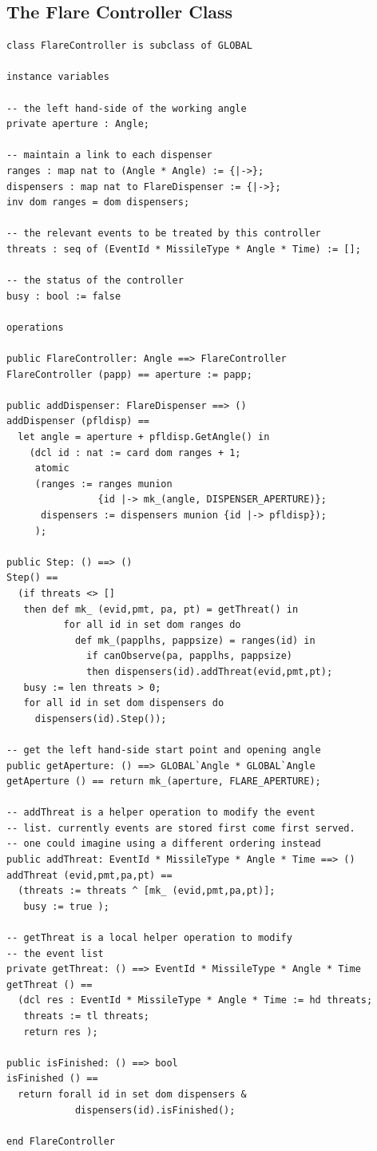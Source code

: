 \documentclass{overturerepchap}
\begin{document}
\subsection{The Flare Controller Class}

\begin{lstlisting}
class FlareController is subclass of GLOBAL

instance variables

-- the left hand-side of the working angle
private aperture : Angle;

-- maintain a link to each dispenser
ranges : map nat to (Angle * Angle) := {|->};
dispensers : map nat to FlareDispenser := {|->};
inv dom ranges = dom dispensers;

-- the relevant events to be treated by this controller
threats : seq of (EventId * MissileType * Angle * Time) := [];

-- the status of the controller
busy : bool := false

operations

public FlareController: Angle ==> FlareController
FlareController (papp) == aperture := papp;

public addDispenser: FlareDispenser ==> ()
addDispenser (pfldisp) ==
  let angle = aperture + pfldisp.GetAngle() in
    (dcl id : nat := card dom ranges + 1;
     atomic
     (ranges := ranges munion 
                {id |-> mk_(angle, DISPENSER_APERTURE)};
      dispensers := dispensers munion {id |-> pfldisp});
     );

public Step: () ==> ()
Step() ==
  (if threats <> []
   then def mk_ (evid,pmt, pa, pt) = getThreat() in
          for all id in set dom ranges do
            def mk_(papplhs, pappsize) = ranges(id) in
              if canObserve(pa, papplhs, pappsize)
              then dispensers(id).addThreat(evid,pmt,pt);
   busy := len threats > 0;
   for all id in set dom dispensers do
     dispensers(id).Step());
 
-- get the left hand-side start point and opening angle
public getAperture: () ==> GLOBAL`Angle * GLOBAL`Angle
getAperture () == return mk_(aperture, FLARE_APERTURE);

-- addThreat is a helper operation to modify the event
-- list. currently events are stored first come first served.
-- one could imagine using a different ordering instead
public addThreat: EventId * MissileType * Angle * Time ==> ()
addThreat (evid,pmt,pa,pt) ==
  (threats := threats ^ [mk_ (evid,pmt,pa,pt)];
   busy := true );

-- getThreat is a local helper operation to modify 
-- the event list
private getThreat: () ==> EventId * MissileType * Angle * Time
getThreat () ==
  (dcl res : EventId * MissileType * Angle * Time := hd threats;
   threats := tl threats;
   return res );

public isFinished: () ==> bool
isFinished () ==
  return forall id in set dom dispensers &
            dispensers(id).isFinished();

end FlareController
\end{lstlisting}
\end{document}
